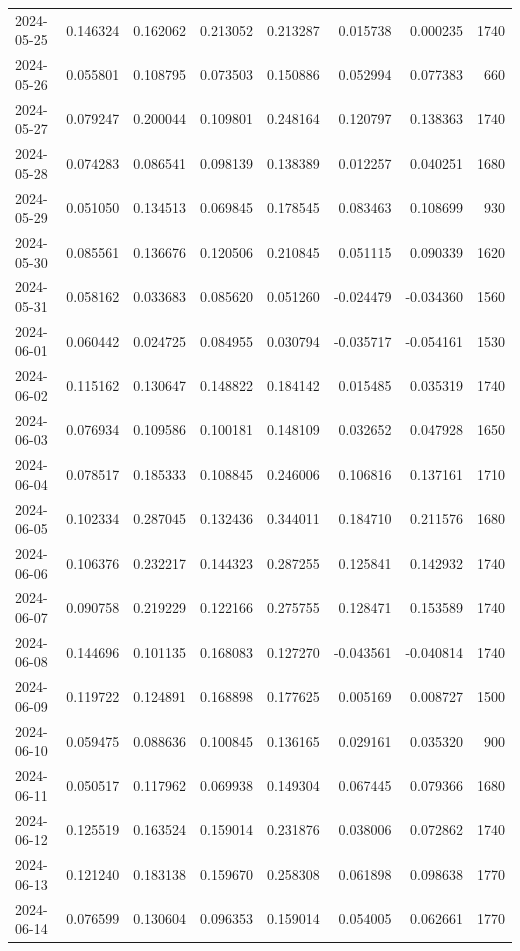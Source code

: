 \begin{tabular}{lrrrrrrr}
2024-05-25 & 0.146324 & 0.162062 & 0.213052 & 0.213287 & 0.015738 & 0.000235 & 1740 \\
2024-05-26 & 0.055801 & 0.108795 & 0.073503 & 0.150886 & 0.052994 & 0.077383 & 660 \\
2024-05-27 & 0.079247 & 0.200044 & 0.109801 & 0.248164 & 0.120797 & 0.138363 & 1740 \\
2024-05-28 & 0.074283 & 0.086541 & 0.098139 & 0.138389 & 0.012257 & 0.040251 & 1680 \\
2024-05-29 & 0.051050 & 0.134513 & 0.069845 & 0.178545 & 0.083463 & 0.108699 & 930 \\
2024-05-30 & 0.085561 & 0.136676 & 0.120506 & 0.210845 & 0.051115 & 0.090339 & 1620 \\
2024-05-31 & 0.058162 & 0.033683 & 0.085620 & 0.051260 & -0.024479 & -0.034360 & 1560 \\
2024-06-01 & 0.060442 & 0.024725 & 0.084955 & 0.030794 & -0.035717 & -0.054161 & 1530 \\
2024-06-02 & 0.115162 & 0.130647 & 0.148822 & 0.184142 & 0.015485 & 0.035319 & 1740 \\
2024-06-03 & 0.076934 & 0.109586 & 0.100181 & 0.148109 & 0.032652 & 0.047928 & 1650 \\
2024-06-04 & 0.078517 & 0.185333 & 0.108845 & 0.246006 & 0.106816 & 0.137161 & 1710 \\
2024-06-05 & 0.102334 & 0.287045 & 0.132436 & 0.344011 & 0.184710 & 0.211576 & 1680 \\
2024-06-06 & 0.106376 & 0.232217 & 0.144323 & 0.287255 & 0.125841 & 0.142932 & 1740 \\
2024-06-07 & 0.090758 & 0.219229 & 0.122166 & 0.275755 & 0.128471 & 0.153589 & 1740 \\
2024-06-08 & 0.144696 & 0.101135 & 0.168083 & 0.127270 & -0.043561 & -0.040814 & 1740 \\
2024-06-09 & 0.119722 & 0.124891 & 0.168898 & 0.177625 & 0.005169 & 0.008727 & 1500 \\
2024-06-10 & 0.059475 & 0.088636 & 0.100845 & 0.136165 & 0.029161 & 0.035320 & 900 \\
2024-06-11 & 0.050517 & 0.117962 & 0.069938 & 0.149304 & 0.067445 & 0.079366 & 1680 \\
2024-06-12 & 0.125519 & 0.163524 & 0.159014 & 0.231876 & 0.038006 & 0.072862 & 1740 \\
2024-06-13 & 0.121240 & 0.183138 & 0.159670 & 0.258308 & 0.061898 & 0.098638 & 1770 \\
2024-06-14 & 0.076599 & 0.130604 & 0.096353 & 0.159014 & 0.054005 & 0.062661 & 1770 \\

\end{tabular}
